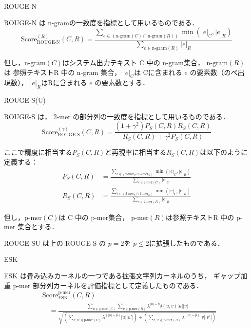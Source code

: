 \documentclass[japanese]{jnlp_1.4}
\renewcommand{\paragraph}{}
\begin{document}
\paragraph{ROUGE-N}
\label{para:ROUGE-N}

ROUGE-N \cite{Lin-2003-NAACL,Lin-2004-WSTS}は n-gramの一致度を指標として用いるものである．
\[
\mbox{Score}^{(R)}_{\mbox{ROUGE-N}}(C,R) = \frac{\displaystyle \sum_{e \in (\mbox{n-gram}(C) \cap \mbox{n-gram}(R))} \min(|e|_{C},|e|_{R})}{\displaystyle \sum_{e \in \mbox{n-gram}(R)} |e|_{R}}
\]

但し，$\mbox{n-gram}(C)$はシステム出力テキスト C 中の n-gram集合，
$\mbox{n-gram}(R)$は 参照テキストR 中の n-gram 集合，
$|e|_{C}$は Cに含まれる $e$ の要素数（のべ出現数），
$|e|_{R}$はRに含まれる $e$ の要素数とする．


\paragraph{ROUGE-S(U)}
\label{para:ROUGE-S}

ROUGE-S \cite{Lin-2004-WSTS}は， 2-mer の部分列の一致度を指標として用いるものである．
\[
\mbox{Score}^{(\gamma)}_{\mbox{ROUGE-S}}(C,R) = \frac{(1+\gamma^{2})P_{S}(C,R) R_{S}(C,R)}{R_{S}(C,R)+\gamma^{2}P_{S}(C,R)} 
\]

ここで精度に相当する$P_{S}(C,R)$と再現率に相当する$R_{S}(C,R)$は以下のように定義する：
\begin{align*}
P_{S}(C,R) & =  \frac{\displaystyle \sum_{e\in (\mbox{2-mer}_{C} \cap \mbox{2-mer}_{R})} \min(|e|_{C},|e|_{R})}{\displaystyle \sum_{e\in\mbox{2-mer}(C)}|e|_{C}} \\
R_{S}(C,R) & = 
 \frac{\displaystyle \sum_{e\in (\mbox{2-mer}_{C} \cap \mbox{2-mer}_{R})} \min(|e|_{C},|e|_{R})}{\displaystyle \sum_{e\in\mbox{2-mer}(R)}|e|_{R}} 
\end{align*}

但し，$\mbox{p-mer}(C)$は C 中の p-mer集合，
$\mbox{p-mer}(R)$は参照テキストR 中の p-mer 集合とする．

ROUGE-SU は上の ROUGE-S の $p=2$を $p\leq 2$に拡張したものである．


\paragraph{ESK}
\label{para:ESK}

ESK \cite{hirao-2006-IPSJ-journal}は畳み込みカーネルの一つである拡張文字列カーネルのうち，
ギャップ加重 p-mer 部分列カーネルを評価指標として定義したものである．
\[
\begin{split}
 & \mbox{Score}^{\mbox{p-mer}}_{\mbox{ESK}}  (C,R) \\ 
 &\quad = \frac{\displaystyle \sum_{u\in{\mbox{p-mer}(C)}}
 \sum_{v\in{\mbox{p-mer}(R)}} \lambda^{|u|-p}
 \delta(u,v)|u||v|}{\displaystyle \sqrt{(\sum_{u,u'\in{\mbox{p-mer}(C)}}
 \lambda^{(|u|-p)}|u||u'|) + ( \sum_{v,v'\in{\mbox{p-mer}(R)}} \lambda^{(|v|-p)}|v||v'|)}}
\end{split}
\]
\end{document}
